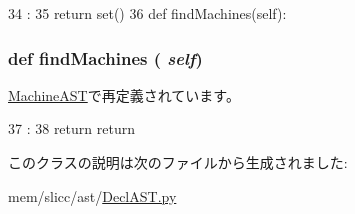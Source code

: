 \begin{DoxyCode}
34                                 :
35         return set()
36 
    def findMachines(self):
\end{DoxyCode}
\hypertarget{classslicc_1_1ast_1_1DeclAST_1_1DeclAST_a716f8a2874cc6a4d0c5ed3c2f90f236d}{
\subsubsection[{findMachines}]{\setlength{\rightskip}{0pt plus 5cm}def findMachines ( {\em self})}}
\label{classslicc_1_1ast_1_1DeclAST_1_1DeclAST_a716f8a2874cc6a4d0c5ed3c2f90f236d}


\hyperlink{classslicc_1_1ast_1_1MachineAST_1_1MachineAST_a716f8a2874cc6a4d0c5ed3c2f90f236d}{MachineAST}で再定義されています。


\begin{DoxyCode}
37                           :
38         return
        return
\end{DoxyCode}


このクラスの説明は次のファイルから生成されました:\begin{DoxyCompactItemize}
\item 
mem/slicc/ast/\hyperlink{DeclAST_8py}{DeclAST.py}\end{DoxyCompactItemize}
